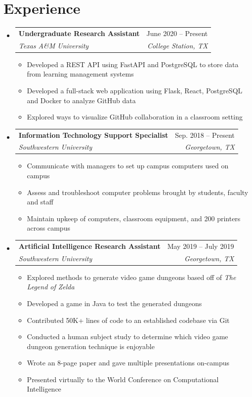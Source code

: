 \documentclass[letterpaper,11pt]{article}
\makeatletter
\newcommand{\resumeItem}[1]{
  \item\small{
    {#1 \vspace{-2pt}}
  }
}
\newcommand{\resumeSubheading}[4]{
  \vspace{-2pt}\item
    \begin{tabular*}{0.97\textwidth}[t]{l@{\extracolsep{\fill}}r}
      \textbf{#1} & #2 \\
      \textit{\small#3} & \textit{\small #4} \\
    \end{tabular*}\vspace{-7pt}
}
\newcommand{\resumeSubHeadingListStart}{\begin{itemize}[leftmargin=0.15in, label={}]}
\newcommand{\resumeSubHeadingListEnd}{\end{itemize}}
\newcommand{\resumeItemListStart}{\begin{itemize}}
\newcommand{\resumeItemListEnd}{\end{itemize}\vspace{-5pt}}
\makeatother
\begin{document}
\section{Experience}
\resumeSubHeadingListStart
\resumeSubheading
  {Undergraduate Research Assistant}{June 2020 -- Present}
  {Texas A\&M University}{College Station, TX}
\resumeItemListStart
\resumeItem{Developed a REST API using FastAPI and PostgreSQL to store data from learning management systems}
\resumeItem{Developed a full-stack web application using Flask, React, PostgreSQL and Docker to analyze GitHub data}
\resumeItem{Explored ways to visualize GitHub collaboration in a classroom setting}
\resumeItemListEnd
\resumeSubheading
  {Information Technology Support Specialist}{Sep. 2018 -- Present}
  {Southwestern University}{Georgetown, TX}
\resumeItemListStart
\resumeItem{Communicate with managers to set up campus computers used on campus}
\resumeItem{Assess and troubleshoot computer problems brought by students, faculty and staff}
\resumeItem{Maintain upkeep of computers, classroom equipment, and 200 printers across campus}
\resumeItemListEnd
\resumeSubheading
  {Artificial Intelligence Research Assistant}{May 2019 -- July 2019}
  {Southwestern University}{Georgetown, TX}
\resumeItemListStart
\resumeItem{Explored methods to generate video game dungeons based off of \emph{The Legend of Zelda}}
\resumeItem{Developed a game in Java to test the generated dungeons}
\resumeItem{Contributed 50K+ lines of code to an established codebase via Git}
\resumeItem{Conducted  a human subject study to determine which video game dungeon generation technique is enjoyable}
\resumeItem{Wrote an 8-page paper and gave multiple presentations on-campus}
\resumeItem{Presented virtually to the World Conference on Computational Intelligence}
\resumeItemListEnd
\resumeSubHeadingListEnd
\end{document}
